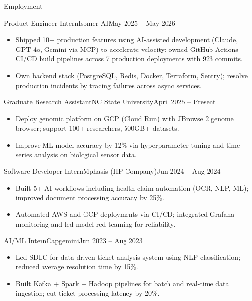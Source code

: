 \documentclass[]{mcdowellcv}
\begin{document}
\makeheader

\begin{cvsection}{Employment}
  \begin{cvsubsection}{Product Engineer Intern}{Isomer AI}{May 2025 -- May 2026}
    \begin{itemize}
      \item Shipped 10+ production features using AI-assisted development (Claude, GPT-4o, Gemini via MCP) to accelerate velocity; owned GitHub Actions CI/CD build pipelines across 7 production deployments with 923 commits.
      \item Own backend stack (PostgreSQL, Redis, Docker, Terraform, Sentry); resolve production incidents by tracing failures across async services.
    \end{itemize}
    \vspace{-1.5pt}
  \end{cvsubsection}

  \begin{cvsubsection}{Graduate Research Assistant}{NC State University}{April 2025 -- Present}
    \begin{itemize}
      \item Deploy genomic platform on GCP (Cloud Run) with JBrowse 2 genome browser; support 100+ researchers, 500GB+ datasets.
      \item Improve ML model accuracy by 12\% via hyperparameter tuning and time-series analysis on biological sensor data.
    \end{itemize}
    \vspace{-1.5pt}
  \end{cvsubsection}

  \begin{cvsubsection}{Software Developer Intern}{Mphasis (HP Company)}{Jun 2024 -- Aug 2024}
    \begin{itemize}
      \item Built 5+ AI workflows including health claim automation (OCR, NLP, ML); improved document processing accuracy by 25\%.
      \item Automated AWS and GCP deployments via CI/CD; integrated Grafana monitoring and led model red-teaming for reliability.
    \end{itemize}
    \vspace{-1.5pt}
  \end{cvsubsection}

  \begin{cvsubsection}{AI/ML Intern}{Capgemini}{Jun 2023 -- Aug 2023}
    \begin{itemize}
      \item Led SDLC for data-driven ticket analysis system using NLP classification; reduced average resolution time by 15\%.
      \item Built Kafka + Spark + Hadoop pipelines for batch and real-time data ingestion; cut ticket-processing latency by 20\%.
    \end{itemize}
    \vspace{-1.5pt}
  \end{cvsubsection}
\end{cvsection}
\end{document}
